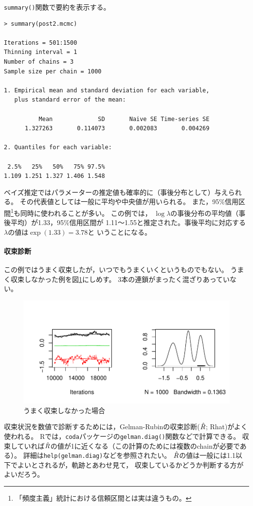 \documentclass[11pt,uplatex]{jsarticle}
\begin{document}
\texttt{summary()}関数で要約を表示する。
\begin{lstlisting}
> summary(post2.mcmc)

Iterations = 501:1500
Thinning interval = 1 
Number of chains = 3 
Sample size per chain = 1000 

1. Empirical mean and standard deviation for each variable,
   plus standard error of the mean:

          Mean             SD       Naive SE Time-series SE 
      1.327263       0.114073       0.002083       0.004269 

2. Quantiles for each variable:

 2.5%   25%   50%   75% 97.5% 
1.109 1.251 1.327 1.406 1.548 

\end{lstlisting}
%
ベイズ推定ではパラメーターの推定値も確率的に（事後分布として）与えられる。
その代表値としては一般に平均や中央値が用いられる。
また，95\%信用区間\footnote{「頻度主義」統計における信頼区間とは実は違うもの。}も同時に使われることが多い。
この例では，
$\log\lambda$の事後分布の平均値（事後平均）が1.33，95\%信用区間が
1.11〜1.55と推定された。事後平均に対応する$\lambda$の値は$\exp(1.33)=3.78$と
いうことになる。

\paragraph{収束診断}
この例ではうまく収束したが，いつでもうまくいくというものでもない。
うまく収束しなかった例を図\ref{bad_mcmc}にしめす。
3本の連鎖がまったく混ざりあっていない。
\begin{figure}[htbp]
	\begin{center}
		\includegraphics[bb=0 0 420 210, clip, width=320 bp]{bad_mcmc.pdf}
	\end{center}
	\caption{うまく収束しなかった場合}
	\label{bad_mcmc}
\end{figure}

収束状況を数値で診断するためには，Gelman-Rubinの収束診断($\Hat{R}$; Rhat)がよく使われる。
\textsf{R}では，\texttt{coda}パッケージの\texttt{gelman.diag()}関数などで計算できる。
収束していれば$\Hat{R}$の値が1に近くなる（この計算のためには複数のchainが必要である）。
詳細は\texttt{help(gelman.diag)}などを参照されたい。
$\Hat{R}$の値は一般には1.1以下でよいとされるが，軌跡とあわせ見て，
収束しているかどうか判断する方がよいだろう。
\end{document}

